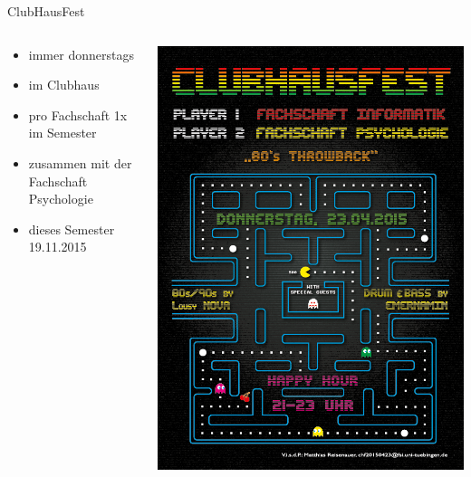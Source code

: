 \documentclass{beamer}
\begin{document}
		
	\begin{frame}{ClubHausFest}
		\begin{columns}
			\begin{column}{.5\linewidth}
				\begin{itemize}
					\item immer donnerstags
					\item im Clubhaus
					\item pro Fachschaft 1x im Semester
					\item zusammen mit der Fachschaft Psychologie
					\item dieses Semester 19.11.2015
				\end{itemize}
			\end{column}
			\begin{column}{.5\linewidth}
				\includegraphics[width=\linewidth]{CHF_Flyer.png}
			\end{column}
		\end{columns}
	\end{frame}
	
\end{document}
